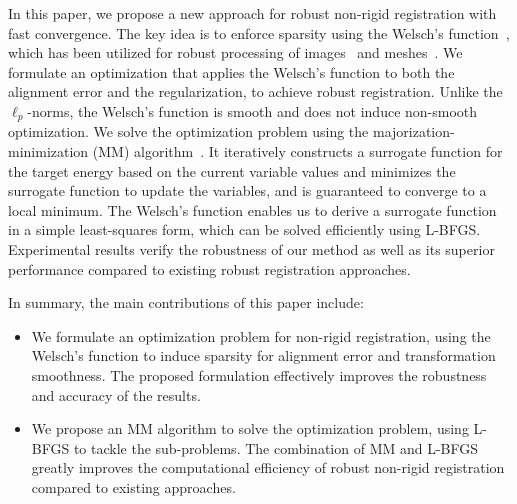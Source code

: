 In this paper, we propose a new approach for robust non-rigid registration with fast convergence. The key idea is to enforce sparsity using the Welsch's function~\cite{holland1977robust}, which has been utilized for robust processing of images~\cite{ham2015robust} and meshes~\cite{zhang2018static}.
We formulate an optimization that applies the Welsch's function to both the alignment error and the regularization, to achieve robust registration.
Unlike the $\ell_p$-norms, the Welsch's function is smooth and does not induce non-smooth optimization.
We solve the optimization problem using the majorization-minimization (MM) algorithm~\cite{Lange2004}. It iteratively constructs a surrogate function for the target energy based on the current variable values and minimizes the surrogate function to update the variables, and is guaranteed to converge to a local minimum.
The Welsch's function enables us to derive a surrogate function in a simple least-squares form, which can be solved efficiently using L-BFGS. Experimental results verify the robustness of our method as well as its superior performance compared to existing robust registration approaches.

In summary, the main contributions of this paper include:
\begin{itemize}
  \item We formulate an optimization problem for non-rigid registration, using the Welsch's function to induce sparsity for alignment error and transformation smoothness. The proposed formulation effectively improves the robustness and accuracy of the results.
  \item We propose an MM algorithm to solve the optimization problem, using L-BFGS to tackle the sub-problems. The combination of MM and L-BFGS greatly improves the computational efficiency of robust non-rigid registration compared to existing approaches.
\end{itemize} 